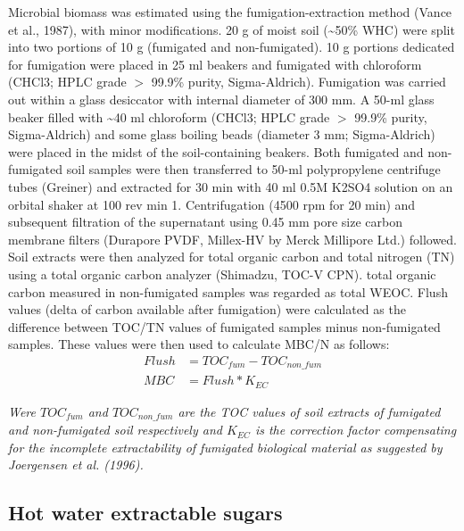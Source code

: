 \documentclass[12pt]{report}
\begin{document}
    	Microbial biomass was estimated using the fumigation-extraction method (Vance et al., 1987), with minor modifications. 20 g of moist soil (\~{}50\% WHC) were split into two portions of 10 g (fumigated and non-fumigated). 10 g portions dedicated for fumigation were placed in 25 ml beakers and fumigated with chloroform (CHCl3; HPLC grade $ > $ 99.9\% purity, Sigma-Aldrich). Fumigation was carried out within a glass desiccator with internal diameter of 300 mm. A 50-ml glass beaker filled with \~{}40 ml chloroform (CHCl3; HPLC grade $ > $ 99.9\% purity, Sigma-Aldrich) and some glass boiling beads (diameter 3 mm; Sigma-Aldrich) were placed in the midst of the soil-containing beakers.  Both fumigated and non-fumigated soil samples were then transferred to 50-ml polypropylene centrifuge tubes (Greiner) and extracted for 30 min with 40 ml 0.5M K2SO4 solution on an orbital shaker at 100 rev min 1. Centrifugation (4500 rpm for 20 min) and subsequent filtration of the supernatant using 0.45 mm pore size carbon membrane filters (Durapore PVDF, Millex-HV by Merck Millipore Ltd.) followed. Soil extracts were then analyzed for total organic carbon and total nitrogen (TN) using a total organic carbon analyzer (Shimadzu, TOC-V CPN). total organic carbon measured in non-fumigated samples was regarded as total WEOC. Flush values (delta of carbon available after fumigation) were calculated as the difference between TOC/TN values of fumigated samples minus non-fumigated samples. These values were then used to calculate MBC/N as follows:\\
    	
    		
    	\begin{align}
    	Flush &= TOC_{fum} - TOC_{non\_fum}\\
    	MBC   &= Flush * K_{EC}
    	\end{align}
    	
    	\begin{adjustwidth}{50pt}{50pt}
    		\begin{footnotesize}
    			\textit{Were $ TOC_{fum} $ and $ TOC_{non\_fum} $ are the TOC values of soil extracts of fumigated and non-fumigated soil respectively and $ K_{EC} $  is the correction factor compensating for the incomplete extractability of fumigated biological material as suggested by Joergensen et al. (1996).}\\
    		\end{footnotesize}
    	\end{adjustwidth} 
    	
    
    \subsection{Hot water extractable sugars}
    	
\end{document}
